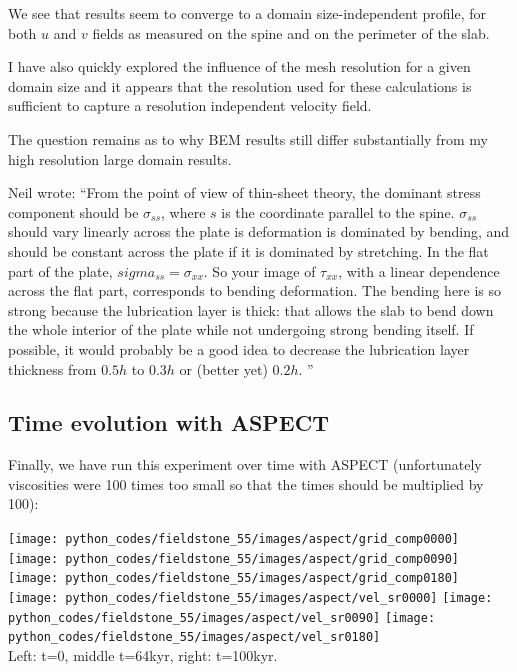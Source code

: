 We see that results seem to converge to a domain size-independent profile, for both $u$ and $v$
fields as measured on the spine and on the perimeter of the slab. 

I have also quickly explored the influence of the mesh resolution for a given domain size 
and it appears that the resolution used for these calculations is sufficient to capture 
a resolution independent velocity field.

The question remains as to why BEM results still differ substantially from my high resolution
large domain results.

Neil wrote: ``From the point of view of thin-sheet theory, the dominant stress component
should be $\sigma_{ss}$, where $s$ is the coordinate parallel to the spine. $\sigma_{ss}$
should vary linearly across the plate is deformation is dominated by bending,
and should be constant across the plate if it is dominated by stretching. In the 
flat part of the plate, $sigma_{ss} = \sigma_{xx}$. So your image of $\tau_{xx}$, with
a linear dependence across the flat part, corresponds to bending
deformation. The bending here is so strong because the 
lubrication layer is thick: that allows the slab to bend down the whole interior
of the plate while not undergoing strong bending itself. If possible, it would
probably be a good idea to decrease the lubrication layer thickness from
$0.5 h$ to $0.3 h$ or (better yet) $0.2 h$. ''









\newpage
\subsection*{Time evolution with ASPECT}
Finally, we have run this experiment over time with ASPECT (unfortunately viscosities were 100 times 
too small so that the times should be multiplied by 100):
\begin{center}
\texttt{[image: python\_codes/fieldstone\_55/images/aspect/grid\_comp0000]}
\texttt{[image: python\_codes/fieldstone\_55/images/aspect/grid\_comp0090]}
\texttt{[image: python\_codes/fieldstone\_55/images/aspect/grid\_comp0180]}\\
\texttt{[image: python\_codes/fieldstone\_55/images/aspect/vel\_sr0000]}
\texttt{[image: python\_codes/fieldstone\_55/images/aspect/vel\_sr0090]}
\texttt{[image: python\_codes/fieldstone\_55/images/aspect/vel\_sr0180]}\\
{\captionfont Left: t=0, middle t=64kyr, right: t=100kyr.}
\end{center}


